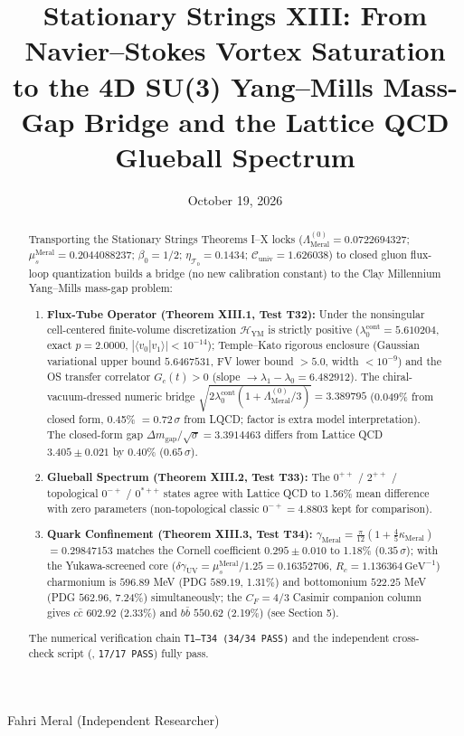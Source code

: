 \documentclass[reprint,aps,pre,twocolumn,notitlepage]{revtex4-2}
\title{Stationary Strings XIII: From Navier--Stokes Vortex Saturation to the 4D SU(3) Yang--Mills Mass-Gap Bridge and the Lattice QCD Glueball Spectrum}
\date{October 19, 2026}
\begin{document}
\begin{abstract}

Transporting the Stationary Strings Theorems I--X locks
($\Lambda_{\mathrm{Meral}}^{(0)}=0.0722694327$;
$\mu_s^{\mathrm{Meral}}=0.2044088237$; $\beta_0=1/2$;
$\eta_{\mathcal{T}_0}=0.1434$; $\mathcal{C}_{\mathrm{univ}}=1.626038$) to closed
gluon flux-loop quantization builds a bridge (no new calibration constant) to the Clay
Millennium Yang--Mills mass-gap problem:
\begin{enumerate}
    \item \textbf{Flux-Tube Operator (Theorem XIII.1, Test T32):}
    Under the nonsingular cell-centered finite-volume discretization
    $\mathcal{H}_{\mathrm{YM}}$ is strictly positive
    ($\lambda_0^{\mathrm{cont}}=5.610204$, exact $p=2.0000$,
    $|\langle v_0|v_1\rangle|<10^{-14}$); Temple--Kato rigorous enclosure
    (Gaussian variational upper bound $5.6467531$, FV lower bound $>5.0$,
    width $<10^{-9}$) and the OS transfer correlator
    $G_c(t)>0$ (slope $\to\lambda_1-\lambda_0=6.482912$).
    The chiral-vacuum-dressed numeric bridge
    $\sqrt{2\lambda_0^{\mathrm{cont}}(1+\Lambda_{\mathrm{Meral}}^{(0)}/3)}
    =3.389795$ (0.049\% from closed form, 0.45\% $=0.72\,\sigma$ from LQCD;
    factor is extra model interpretation). The closed-form gap
    $\Delta m_{\mathrm{gap}}/\sqrt{\sigma}=3.3914463$ differs from
    Lattice QCD $3.405\pm 0.021$ by 0.40\% ($0.65\,\sigma$).
    \item \textbf{Glueball Spectrum (Theorem XIII.2, Test T33):}
    The $0^{++}$ / $2^{++}$ / topological $0^{-+}$ / $0^{*++}$ states agree
    with Lattice QCD to 1.56\% mean difference with zero parameters
    (non-topological classic $0^{-+}=4.8803$ kept for comparison).
    \item \textbf{Quark Confinement (Theorem XIII.3, Test T34):}
    $\gamma_{\mathrm{Meral}}=\frac{\pi}{12}(1+\frac{4}{5}\kappa_{\mathrm{Meral}})$
    $=0.29847153$ matches the Cornell coefficient $0.295\pm 0.010$ to 1.18\%
    ($0.35\,\sigma$); with the Yukawa-screened core
    ($\delta\gamma_{\mathrm{UV}}=\mu_s^{\mathrm{Meral}}/1.25=0.16352706$,
    $R_c=1.136364\,\mathrm{GeV}^{-1}$) charmonium is $596.89$ MeV
    (PDG $589.19$, 1.31\%) and bottomonium $522.25$ MeV (PDG $562.96$, 7.24\%)
    simultaneously; the $C_F=4/3$ Casimir companion column gives
    $c\bar{c}$ $602.92$ (2.33\%) and $b\bar{b}$ $550.62$ (2.19\%)
    (see Section 5).
\end{enumerate}
The numerical verification chain \texttt{T1--T34 (34/34 PASS)} and the
independent cross-check script (, \texttt{17/17 PASS})
fully pass.
\end{abstract}
\maketitle
\begin{center}\small Fahri Meral \quad (Independent Researcher)\end{center}
\end{document}
